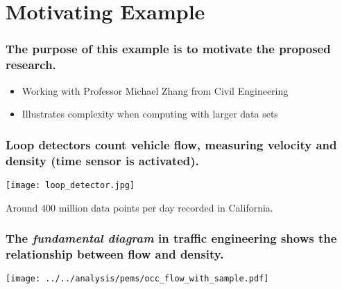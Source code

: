 \documentclass{beamer}
\begin{document}
\section{Motivating Example}
\begin{frame}

    \frametitle{The purpose of this example is to motivate the proposed
    research.}


    \begin{itemize}
        \item Working with Professor Michael Zhang from Civil Engineering
        \item Illustrates complexity when computing with larger data sets
    \end{itemize}

\end{frame}
\begin{frame}

    \frametitle{Loop detectors count vehicle flow, measuring velocity and
    density (time sensor is activated).}


\centerline{\texttt{[image: loop\_detector.jpg]}}

Around 400 million data points per day recorded in California.

\end{frame}
\begin{frame}

    \frametitle{The \emph{fundamental diagram} in traffic engineering shows
        the relationship between flow and density.}


    \centerline{\texttt{[image: ../../analysis/pems/occ\_flow\_with\_sample.pdf]}}

\end{frame}
\end{document}
